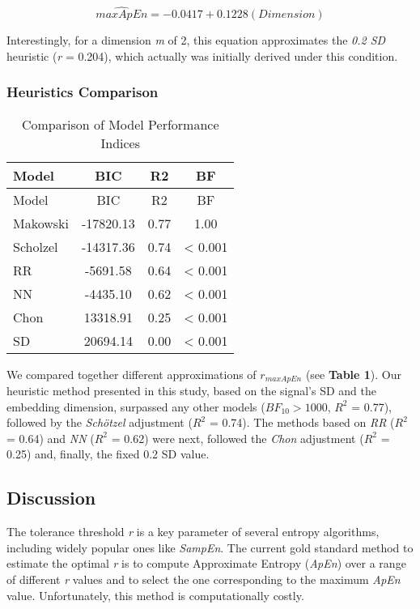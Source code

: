 \documentclass[
  man]{apa6}
\begin{document}
\begin{equation}
\widehat{maxApEn} = -0.0417 + 0.1228(Dimension)
\end{equation}

Interestingly, for a dimension \emph{m} of 2, this equation approximates the \emph{0.2 SD} heuristic (\emph{r} = 0.204), which actually was initially derived under this condition.

\hypertarget{heuristics-comparison}{%
\subsubsection{Heuristics Comparison}\label{heuristics-comparison}}

\begin{longtable}[]{@{}lccc@{}}
\caption{Comparison of Model Performance Indices}\tabularnewline
\toprule()
Model & BIC & R2 & BF \\
\midrule()
\endfirsthead
\toprule()
Model & BIC & R2 & BF \\
\midrule()
\endhead
Makowski & -17820.13 & 0.77 & 1.00 \\
Scholzel & -14317.36 & 0.74 & \textless{} 0.001 \\
RR & -5691.58 & 0.64 & \textless{} 0.001 \\
NN & -4435.10 & 0.62 & \textless{} 0.001 \\
Chon & 13318.91 & 0.25 & \textless{} 0.001 \\
SD & 20694.14 & 0.00 & \textless{} 0.001 \\
\bottomrule()
\end{longtable}

We compared together different approximations of \(r_{maxApEn}\) (see \textbf{Table 1}). Our heuristic method presented in this study, based on the signal's SD and the embedding dimension, surpassed any other models (\(BF_{10} > 1000\), \(R^2\) = 0.77), followed by the \emph{Schötzel} adjustment (\(R^2\) = 0.74). The methods based on \emph{RR} (\(R^2\) = 0.64) and \emph{NN} (\(R^2\) = 0.62) were next, followed the \emph{Chon} adjustment (\(R^2\) = 0.25) and, finally, the fixed 0.2 SD value.

\hypertarget{discussion}{%
\subsection{Discussion}\label{discussion}}

The tolerance threshold \emph{r} is a key parameter of several entropy algorithms, including widely popular ones like \emph{SampEn}. The current gold standard method to estimate the optimal \emph{r} is to compute Approximate Entropy (\emph{ApEn}) over a range of different \emph{r} values and to select the one corresponding to the maximum \emph{ApEn} value. Unfortunately, this method is computationally costly.
\end{document}

